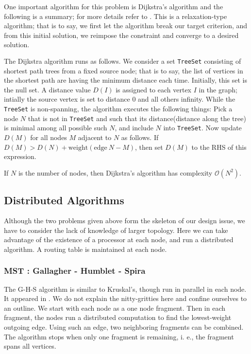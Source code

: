 \documentclass[fleqn,a4paper]{SelfArx}
\begin{document}
\par One important algorithm for this problem is Dijkstra's algorithm and the following is a summary; for more details refer to \cite{Dijkstra:1959a}.
This is a relaxation-type algorithm; that is to say, we first let the algorithm break our target criterion, and from this initial solution, we reimpose the constraint and converge to a desired solution.

\par The Dijkstra algorithm runs as follows. We consider a set \texttt{TreeSet} consisting of shortest path trees from a fixed source node; 
that is to say, 
the list of vertices in the shortest path are having the minimum distance each time. Initially, this set is the null set.
A distance value $D(I)$ is assigned to each vertex $I$ in the graph; intially the source vertex is set to distance $0$ and all others infinity. 
While the \texttt{TreeSet} is non-spanning, the algorithm executes the following things: Pick a node $N$ that is not in \texttt{TreeSet} 
and such that its distance(distance along the tree) is minimal among all possible such $N$, 
and include $N$ into \texttt{TreeSet}. 
Now update $D(M)$ for all nodes $M$ adjacent to $N$ as follows. If $D(M) > D(N) + \mathrm{weight}(\mathrm{edge}\ N-M)$, then set $D(M)$ 
to the RHS of this expression.

\par If $N$ is the number of nodes, then Dijkstra's algorithm has complexity $\mathcal{O}(N^2)$.

\subsection{Distributed Algorithms}

 Although the two problems given above form the skeleton of our design issue, we have to consider the lack of knowledge of larger topology.
Here we can take advantage of the existence of a processor at each node, and run a distributed algorithm. A routing table is maintained at each node.

\subsubsection{MST : Gallagher - Humblet - Spira}

\par The G-H-S algorithm is similar to Kruskal's, though run in parallel in each node. It appeared in \cite{Gallager:1983HumbletSpira}. We 
do not explain the nitty-gritties here and confine ourselves to an outline. We start with each node as a one node fragment. Then in 
each fragment, the nodes run a distributed computation to find the lowest-weight outgoing edge. Using such an edge, two neighboring
fragments can be combined. The algorithm stops when only one fragment is remaining, i. e., the fragment spans all vertices.
\end{document}
